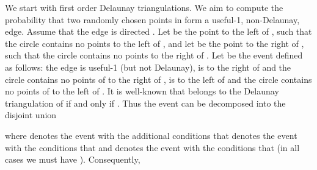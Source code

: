 \documentclass {journal}
\newcommand {\fodts}{first order Delaunay triangulations}
\begin{document}
We start with \fodts. We aim to compute the probability that two
randomly chosen points  in  form a useful-1,
non-Delaunay, edge. Assume that the edge is directed
. Let  be the point to the left of
, such that the circle  contains no
points to the left of , and let  be the
point to the right of , such that the circle
 contains no points to the right of
. Let  be the event defined as
follows: the edge  is useful-1 (but not Delaunay),
 is to the right of  and the circle
 contains no points of  to the right of
,  is to the left of 
and the circle  contains no points of  to the left
of . It is well-known that 
belongs to the Delaunay triangulation of  if and only if
. Thus the event  can be
decomposed into the disjoint union

where  denotes the event  with the
additional conditions that    denotes the event  with the
 conditions that   and  denotes the event  with
the  conditions that   (in all cases we must have ).  Consequently,
\end{document}
